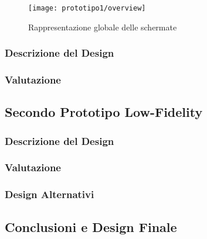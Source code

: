 \begin{figure}[h]
  \begin{center}
    \texttt{[image: prototipo1/overview]}
    \caption{Rappresentazione globale delle schermate}
    \label{fig:p1_overview}
  \end{center}
\end{figure}



\clearpage
\subsubsection{Descrizione del Design}
\subsubsection{Valutazione}

\subsection{Secondo Prototipo Low-Fidelity}
\subsubsection{Descrizione del Design}
\subsubsection{Valutazione}

\subsubsection{Design Alternativi}

\subsection{Conclusioni e Design Finale}
